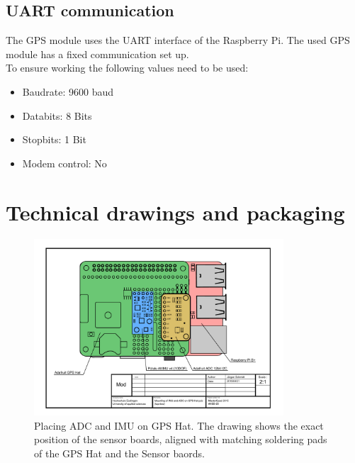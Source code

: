 \subsection{UART communication}
\label{sec:hardware:Components:UART}
The GPS module uses the UART interface of the Raspberry Pi. The used GPS module has a fixed communication set up.\\
To ensure working the following values need to be used:
\begin{itemize}
	\item Baudrate: 9600 baud
	\item Databits: 8 Bits
	\item Stopbits:	1 Bit
	\item Modem control: No
\end{itemize}


\section{Technical drawings and packaging}
\label{sec:hardware:techDrawAndPack}

\begin{figure}[H]
    \centering
    \includegraphics[angle=90,width=0.83\textwidth]{fig/ch-rpi-hardware/A4_tech_draw_topview_sensor_mountingPositions}
    \caption[Placing ADC and IMU on GPS Hat]{Placing ADC and IMU on GPS Hat. The drawing shows the exact position of the sensor boards, aligned with matching soldering pads of the GPS Hat and the Sensor baords.}
    \label{fig:hardware:sensorMount}
\end{figure}

